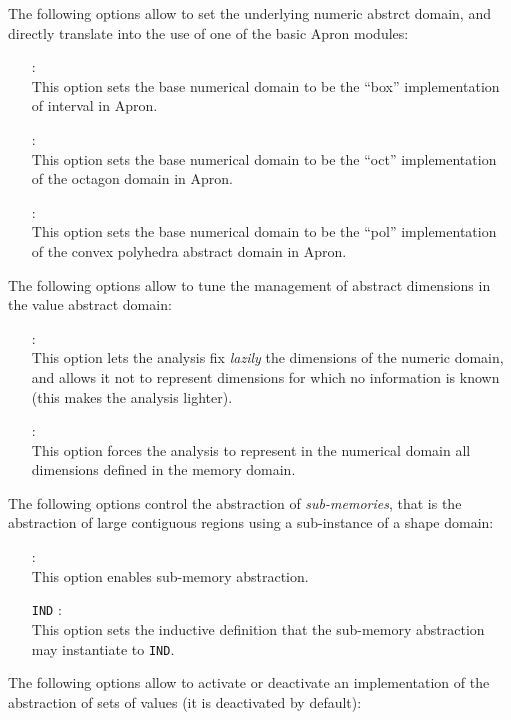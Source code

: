 The following options allow to set the underlying numeric abstrct
domain, and directly translate into the use of one of the basic
Apron modules:
\begin{itemize}
\item[\doption{-nd-box}]: \\
  This option sets the base numerical domain to be the ``box''
  implementation of interval in Apron.
\item[\doption{-nd-oct}]: \\
  This option sets the base numerical domain to be the ``oct''
  implementation of the octagon domain in Apron.
\item[\doption{-nd-pol}]: \\
  This option sets the base numerical domain to be the ``pol''
  implementation of the convex polyhedra abstract domain in Apron.
\end{itemize}
The following options allow to tune the management of abstract dimensions
in the value abstract domain:
\begin{itemize}
\item[\doption{-dynenv-yes}] \optadv: \\
  This option lets the analysis fix {\em lazily} the dimensions of the
  numeric domain, and allows it not to represent dimensions for which
  no information is known (this makes the analysis lighter).
\item[\doption{-dynenv-no}] \optadv: \\
  This option forces the analysis to represent in the numerical domain
  all dimensions defined in the memory domain.
\end{itemize}
The following options control the abstraction of {\em sub-memories},
that is the abstraction of large contiguous regions using a sub-instance
of a shape domain:
\begin{itemize}
\item[\doption{-add-submem}] \optadv: \\
  This option enables sub-memory abstraction.
\item[\doption{-submem-ind} \texttt{IND}] \optadv: \\
  This option sets the inductive definition that the sub-memory abstraction 
  may instantiate to \texttt{IND}.
\end{itemize}
The following options allow to activate or deactivate an implementation
of the abstraction of sets of values (it is deactivated by default):
